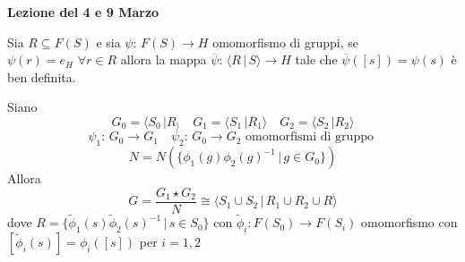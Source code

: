 

\textbf{Lezione del 4 e 9  Marzo}
\begin{fatto} Sia $R\subseteq F(S)$ e sia $\psi:\, F(S) \to H $ omomorfismo di gruppi, se $\psi(r)=e_H \, \, \forall r \in R$ allora la  mappa $\overline{\psi}:\,\langle R \, \vert \, S \rangle \to H$   tale che $\overline{\psi}([s])=\psi(s)$ \`e ben definita.
\end{fatto}

\begin{prop}Siano 
$$G_0=\langle S_0 \, \vert R_ \rangle \quad G_1=\langle S_1 \, \vert R_1 \rangle \quad G_2=\langle S_2 \, \vert R_2 \rangle$$
$$\psi_1:\, G_0\to G_1  \quad \psi_2:\, G_0 \to G_2 \text{ omomorfismi di gruppo } $$
$$N = N( \{ \phi_1(g) \phi_2(g)^{-1} \, \vert\, g \in G_0 \})$$
Allora $$G=\frac{G_1\star G_2}{N} \cong \langle S_1 \cup S_2 \, \vert \, R_1 \cup R_2 \cup R\rangle$$
dove  $R=\{ \tilde{\phi}_1 (s) \tilde{\phi}_2(s)^{-1} \, \vert \, s\in S_0\} $ con  $\tilde{\phi}_i : F(S_0) \to F(S_i)$ omomorfismo con  $ [ \tilde{\phi}_i(s)]
 =\phi_i ([s])$ per $i=1,2$
\end{prop}

